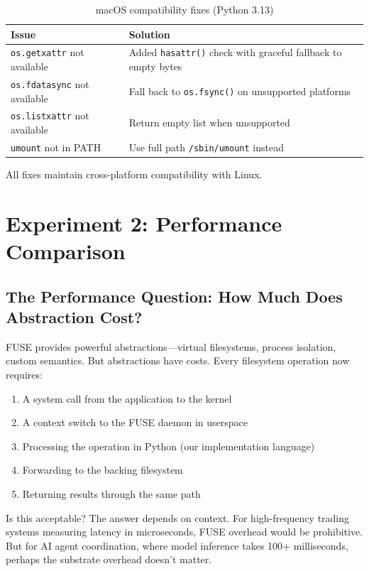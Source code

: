\documentclass[11pt]{article}
\begin{document}
\begin{table}[h]
\centering
\begin{tabular}{p{4cm}p{9cm}}
\toprule
\textbf{Issue} & \textbf{Solution} \\
\midrule
\texttt{os.getxattr} not available & Added \texttt{hasattr()} check with graceful fallback to empty bytes \\
\texttt{os.fdatasync} not available & Fall back to \texttt{os.fsync()} on unsupported platforms \\
\texttt{os.listxattr} not available & Return empty list when unsupported \\
\texttt{umount} not in PATH & Use full path \texttt{/sbin/umount} instead \\
\bottomrule
\end{tabular}
\caption{macOS compatibility fixes (Python 3.13)}
\end{table}

All fixes maintain cross-platform compatibility with Linux.

\section{Experiment 2: Performance Comparison}

\subsection{The Performance Question: How Much Does Abstraction Cost?}

FUSE provides powerful abstractions---virtual filesystems, process isolation, custom semantics. But abstractions have costs. Every filesystem operation now requires:
\begin{enumerate}
\item A system call from the application to the kernel
\item A context switch to the FUSE daemon in userspace
\item Processing the operation in Python (our implementation language)
\item Forwarding to the backing filesystem
\item Returning results through the same path
\end{enumerate}

Is this acceptable? The answer depends on context. For high-frequency trading systems measuring latency in microseconds, FUSE overhead would be prohibitive. But for AI agent coordination, where model inference takes 100+ milliseconds, perhaps the substrate overhead doesn't matter.
\end{document}
